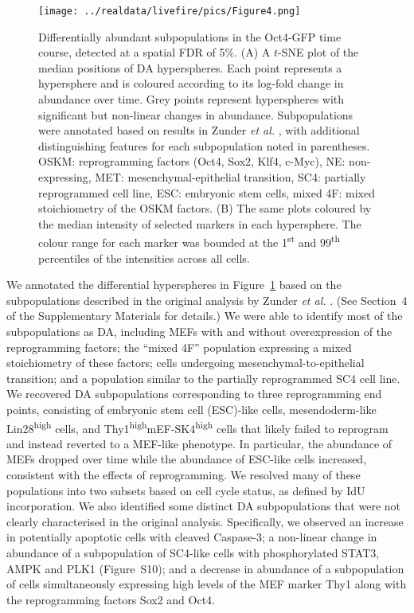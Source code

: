 \documentclass{article}
\newcommand{\suppannotate}{4}
\newcommand{\suppfignonlinear}{S10}
\begin{document}
\begin{figure}[p]
    \begin{center}
    \texttt{[image: ../realdata/livefire/pics/Figure4.png]}
\end{center}
    \caption{
        Differentially abundant subpopulations in the Oct4-GFP time course, detected at a spatial FDR of 5\%.
        (A) A $t$-SNE plot of the median positions of DA hyperspheres. 
        Each point represents a hypersphere and is coloured according to its log-fold change in abundance over time.
        Grey points represent hyperspheres with significant but non-linear changes in abundance.
        Subpopulations were annotated based on results in Zunder \emph{et al.} \cite{zunder2015continuous}, with additional distinguishing features for each subpopulation noted in parentheses.
        OSKM: reprogramming factors (Oct4, Sox2, Klf4, c-Myc), NE: non-expressing, MET: mesenchymal-epithelial transition, SC4: partially reprogrammed cell line, ESC: embryonic stem cells, mixed 4F: mixed stoichiometry of the OSKM factors.
        (B) The same plots coloured by the median intensity of selected markers in each hypersphere.
        The colour range for each marker was bounded at the 1\textsuperscript{st} and 99\textsuperscript{th} percentiles of the intensities across all cells.
    }

    \label{fig:oct4}
\end{figure}

We annotated the differential hyperspheres in Figure~\ref{fig:oct4} based on the subpopulations described in the original analysis by Zunder \emph{et al.} \cite{zunder2015continuous}.
(See Section~\suppannotate{} of the Supplementary Materials for details.)
We were able to identify most of the subpopulations as DA, including MEFs with and without overexpression of the reprogramming factors; 
    the ``mixed 4F'' population expressing a mixed stoichiometry of these factors; 
    cells undergoing mesenchymal-to-epithelial transition; 
    and a population similar to the partially reprogrammed SC4 cell line.
We recovered DA subpopulations corresponding to three reprogramming end points, consisting of embryonic stem cell (ESC)-like cells, mesendoderm-like Lin28\textsuperscript{high} cells, and Thy1\textsuperscript{high}mEF-SK4\textsuperscript{high} cells that likely failed to reprogram and instead reverted to a MEF-like phenotype.
In particular, the abundance of MEFs dropped over time while the abundance of ESC-like cells increased, consistent with the effects of reprogramming.
We resolved many of these populations into two subsets based on cell cycle status, as defined by IdU incorporation.
We also identified some distinct DA subpopulations that were not clearly characterised in the original analysis.
Specifically, we observed an increase in potentially apoptotic cells with cleaved Caspase-3;
    a non-linear change in abundance of a subpopulation of SC4-like cells with phosphorylated STAT3, AMPK and PLK1 (Figure~\suppfignonlinear{});
    and a decrease in abundance of a subpopulation of cells simultaneously expressing high levels of the MEF marker Thy1 along with the reprogramming factors Sox2 and Oct4.
\end{document}
